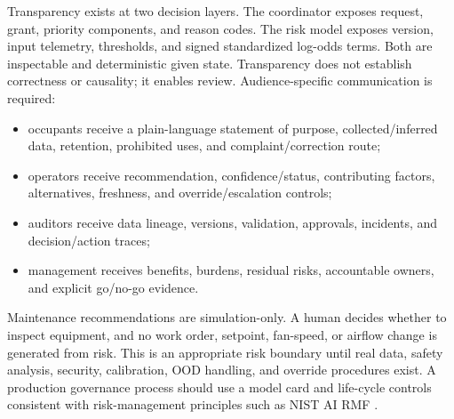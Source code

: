 Transparency exists at two decision layers. The coordinator exposes request, grant, priority components, and reason codes. The risk model exposes version, input telemetry, thresholds, and signed standardized log-odds terms. Both are inspectable and deterministic given state. Transparency does not establish correctness or causality; it enables review. Audience-specific communication is required:
\begin{itemize}
\item occupants receive a plain-language statement of purpose, collected/inferred data, retention, prohibited uses, and complaint/correction route;
\item operators receive recommendation, confidence/status, contributing factors, alternatives, freshness, and override/escalation controls;
\item auditors receive data lineage, versions, validation, approvals, incidents, and decision/action traces;
\item management receives benefits, burdens, residual risks, accountable owners, and explicit go/no-go evidence.
\end{itemize}

Maintenance recommendations are simulation-only. A human decides whether to inspect equipment, and no work order, setpoint, fan-speed, or airflow change is generated from risk. This is an appropriate risk boundary until real data, safety analysis, security, calibration, OOD handling, and override procedures exist. A production governance process should use a model card and life-cycle controls consistent with risk-management principles such as NIST AI RMF \citep{mitchell2019modelcards,nistai2023}.

